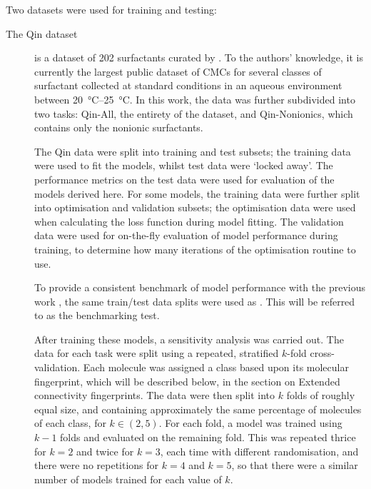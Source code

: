 \newcommand{\lrv}{\vec{v}^{\,(p)}}

Two datasets were used for training and testing:

\begin{description}
    \item[The Qin dataset] is a dataset of 202 surfactants curated by
          \citet{qinPredictingCriticalMicelle2021}. To the authors' knowledge,
          it is currently the largest public dataset of CMCs for several classes
          of surfactant collected at standard conditions in an aqueous
          environment between \SIrange{20}{25}{\celsius}. In this work, the data
          was further subdivided into two tasks: Qin-All, the entirety of the
          dataset, and Qin-Nonionics, which contains only the nonionic
          surfactants.

          The Qin data were split into training and test subsets; the training
          data were used to fit the models, whilst test data were `locked away'.
          The performance metrics on the test data were used for evaluation of
          the models derived here. For some models, the training data were
          further split into optimisation and validation subsets; the
          optimisation data were used when calculating the loss function during
          model fitting. The validation data were used for on-the-fly evaluation
          of model performance during training, to determine how many iterations
          of the optimisation routine to use.

          To provide a consistent benchmark of model performance with
          the previous work \cite{qinPredictingCriticalMicelle2021}, the same
          train/test data splits were used as
          \citet{qinPredictingCriticalMicelle2021}. This will be referred to as
          the benchmarking test.

          After training these models, a sensitivity analysis was carried out.
          The data for each task were split using a repeated, stratified
          $k$-fold cross-validation. Each molecule was assigned a class based
          upon its molecular fingerprint, which will be described below, in the
          section on Extended connectivity fingerprints. The data were then
          split into $k$ folds of roughly equal size, and containing
          approximately the same percentage of molecules of each class, for $k
          \in (2, 5)$. For each fold, a model was trained using $k-1$ folds and
          evaluated on the remaining fold. This was repeated thrice for $k = 2$
          and twice for $k = 3$, each time with different randomisation, and
          there were no repetitions for $k = 4$ and $k = 5$, so that there were
          a similar number of models trained for each value of $k$.


\end{description}
